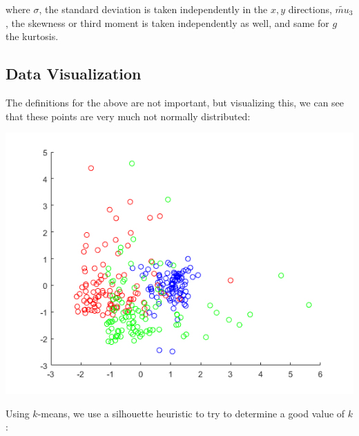 \documentclass[sn-mathphys,Numbered]{sn-jnl}
\begin{document}
where $\sigma$, the standard deviation is taken independently in the $x,y$ directions, $\tilde{mu}_3$, the skewness or third moment is taken independently as well, and same for $g$ the kurtosis.

\subsection{Data Visualization}

The definitions for the above are not important, but visualizing this, we can see that these points are very much not normally distributed:

\begin{center}
\includegraphics[width=\linewidth]{actual_clusters}
\end{center}

Using $k$-means, we use a silhouette heuristic to try to determine a good value of $k$:
\end{document}
